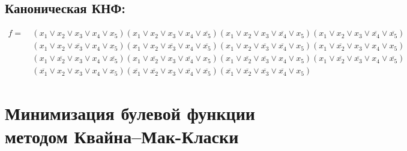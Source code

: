\documentclass{article}
\begin{document}
\subsection*{Каноническая КНФ:}
\begin{align*}
f =\: &\left(x_{1} \lor x_{2} \lor x_{3} \lor x_{4} \lor x_{5}\right)\left(x_{1} \lor x_{2} \lor x_{3} \lor x_{4} \lor \overline{x_{5}}\right)\left(x_{1} \lor x_{2} \lor x_{3} \lor \overline{x_{4}} \lor x_{5}\right)\left(x_{1} \lor x_{2} \lor x_{3} \lor \overline{x_{4}} \lor \overline{x_{5}}\right)\\&\left(x_{1} \lor x_{2} \lor \overline{x_{3}} \lor x_{4} \lor x_{5}\right)\left(x_{1} \lor x_{2} \lor \overline{x_{3}} \lor x_{4} \lor \overline{x_{5}}\right)\left(x_{1} \lor x_{2} \lor \overline{x_{3}} \lor \overline{x_{4}} \lor x_{5}\right)\left(x_{1} \lor \overline{x_{2}} \lor x_{3} \lor x_{4} \lor x_{5}\right)\\&\left(x_{1} \lor \overline{x_{2}} \lor x_{3} \lor x_{4} \lor \overline{x_{5}}\right)\left(x_{1} \lor \overline{x_{2}} \lor x_{3} \lor \overline{x_{4}} \lor x_{5}\right)\left(x_{1} \lor \overline{x_{2}} \lor \overline{x_{3}} \lor x_{4} \lor x_{5}\right)\left(x_{1} \lor \overline{x_{2}} \lor \overline{x_{3}} \lor x_{4} \lor \overline{x_{5}}\right)\\&\left(\overline{x_{1}} \lor x_{2} \lor x_{3} \lor x_{4} \lor x_{5}\right)\left(\overline{x_{1}} \lor \overline{x_{2}} \lor x_{3} \lor \overline{x_{4}} \lor \overline{x_{5}}\right)\left(\overline{x_{1}} \lor \overline{x_{2}} \lor \overline{x_{3}} \lor \overline{x_{4}} \lor x_{5}\right)\end{align*}
\section*{Минимизация булевой функции методом Квайна--Мак-Класки}
\end{document}
